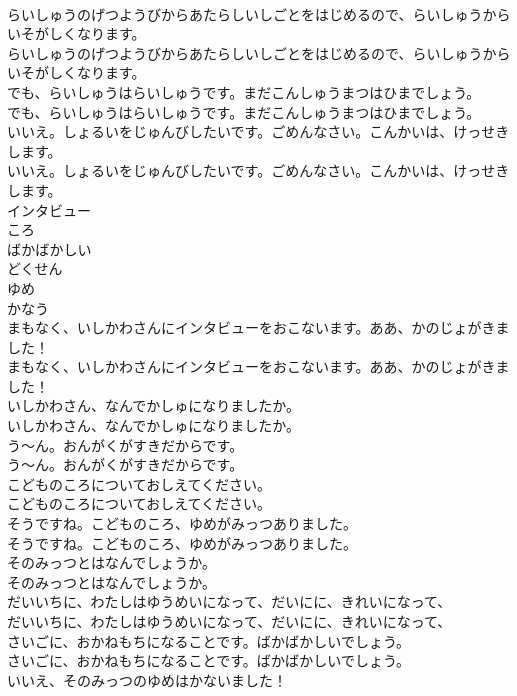 \documentclass[8pt]{extreport}
\begin{document}
\begin{CJK}{UTF8}{min}
\\	らいしゅうのげつようびからあたらしいしごとをはじめるので、らいしゅうからいそがしくなります。	
\\	らいしゅうのげつようびからあたらしいしごとをはじめるので、らいしゅうからいそがしくなります。 
\\	でも、らいしゅうはらいしゅうです。まだこんしゅうまつはひまでしょう。	
\\	でも、らいしゅうはらいしゅうです。まだこんしゅうまつはひまでしょう。 
\\	いいえ。しょるいをじゅんびしたいです。ごめんなさい。こんかいは、けっせきします。	
\\	いいえ。しょるいをじゅんびしたいです。ごめんなさい。こんかいは、けっせきします。 
\\	インタビュー
\\	ころ
\\	ばかばかしい
\\	どくせん
\\	ゆめ
\\	かなう
\\	まもなく、いしかわさんにインタビューをおこないます。ああ、かのじょがきました！	
\\	まもなく、いしかわさんにインタビューをおこないます。ああ、かのじょがきました！ 
\\	いしかわさん、なんでかしゅになりましたか。	
\\	いしかわさん、なんでかしゅになりましたか。 
\\	う〜ん。おんがくがすきだからです。	
\\	う〜ん。おんがくがすきだからです。 
\\	こどものころについておしえてください。	
\\	こどものころについておしえてください。 
\\	そうですね。こどものころ、ゆめがみっつありました。	
\\	そうですね。こどものころ、ゆめがみっつありました。 
\\	そのみっつとはなんでしょうか。	
\\	そのみっつとはなんでしょうか。 
\\	だいいちに、わたしはゆうめいになって、だいにに、きれいになって、	
\\	だいいちに、わたしはゆうめいになって、だいにに、きれいになって、 
\\	さいごに、おかねもちになることです。ばかばかしいでしょう。	
\\	さいごに、おかねもちになることです。ばかばかしいでしょう。 
\\	いいえ、そのみっつのゆめはかないました！	

\end{CJK}
\end{document}
